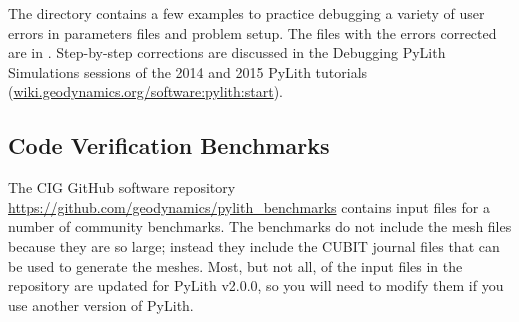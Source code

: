 The directory  contains a few examples to
practice debugging a variety of user errors in parameters files and
problem setup. The files with the errors corrected are in
.  Step-by-step corrections are
discussed in the Debugging PyLith Simulations sessions of the 2014 and
2015 PyLith tutorials
(\url{wiki.geodynamics.org/software:pylith:start}).


\subsection{Code Verification Benchmarks}

The CIG GitHub software repository \url{https://github.com/geodynamics/pylith_benchmarks}
contains input files for a number of community benchmarks. The benchmarks
do not include the mesh files because they are so large; instead they
include the CUBIT journal files that can be used to generate the meshes.
Most, but not all, of the input files in the repository are updated
for PyLith v2.0.0, so you will need to modify them if you use another
version of PyLith.

